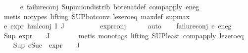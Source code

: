 \begin{isabellebody}
\ \ \ \ \isamarkupfalse%
\ e{}{\isacharunderscore}{\kern0pt}{}\ failure{\isacharunderscore}{\kern0pt}conj\ Sup{\isacharunderscore}{\kern0pt}union{\isacharunderscore}{\kern0pt}distrib\ bot{\isacharunderscore}{\kern0pt}enat{\isacharunderscore}{\kern0pt}def\ comp{\isacharunderscore}{\kern0pt}apply\ e{}{\isacharunderscore}{\kern0pt}neg\isanewline
\ \ \ \ \isamarkupfalse%
\ {\isacharparenleft}{\kern0pt}metis\ {\isacharparenleft}{\kern0pt}no{\isacharunderscore}{\kern0pt}types{\isacharcomma}{\kern0pt}\ lifting{\isacharparenright}{\kern0pt}\ SUP{\isacharunderscore}{\kern0pt}bot{\isacharunderscore}{\kern0pt}conv{\isacharparenleft}{\kern0pt}{}{\isacharparenright}{\kern0pt}\ le{\isacharunderscore}{\kern0pt}zero{\isacharunderscore}{\kern0pt}eq\ max{\isacharunderscore}{\kern0pt}def\ sup{\isacharunderscore}{\kern0pt}max{\isacharparenright}{\kern0pt}\ \isanewline
\ \ \isamarkupfalse%
\ e{}{\isacharcolon}{\kern0pt}\ {\isachardoublequoteopen}expr{\isacharunderscore}{\kern0pt}{}\ {\isacharparenleft}{\kern0pt}hml{\isacharunderscore}{\kern0pt}conj\ I\ J\ {\isasymPhi}{\isacharparenright}{\kern0pt}\ {\isasymle}\ {}{\isachardoublequoteclose}\ \isanewline
\ \ \ \ \isamarkupfalse%
\ expr{\isacharunderscore}{\kern0pt}{}{\isacharunderscore}{\kern0pt}conj\isanewline
\ \ \ \ \isamarkupfalse%
\ auto\isanewline
\ \ \isamarkupfalse%
\ failure{\isacharunderscore}{\kern0pt}conj\ e{}{\isacharunderscore}{\kern0pt}{}\ e{}{\isacharunderscore}{\kern0pt}neg\ \isamarkupfalse%
\ {\isachardoublequoteopen}Sup\ {\isacharparenleft}{\kern0pt}{\isacharparenleft}{\kern0pt}expr{\isacharunderscore}{\kern0pt}{}\ {\isasymcirc}\ {\isasymPhi}{\isacharparenright}{\kern0pt}\ {\isacharbackquote}{\kern0pt}\ J{\isacharparenright}{\kern0pt}\ {\isasymle}\ {}{\isachardoublequoteclose}\isanewline
\ \ \ \ \isamarkupfalse%
\ {\isacharparenleft}{\kern0pt}metis\ {\isacharparenleft}{\kern0pt}mono{\isacharunderscore}{\kern0pt}tags{\isacharcomma}{\kern0pt}\ lifting{\isacharparenright}{\kern0pt}\ SUP{\isacharunderscore}{\kern0pt}least\ comp{\isacharunderscore}{\kern0pt}apply\ le{\isacharunderscore}{\kern0pt}zero{\isacharunderscore}{\kern0pt}eq{\isacharparenright}{\kern0pt}\isanewline
\ \ \isamarkupfalse%
\ {\isachardoublequoteopen}Sup\ {\isacharparenleft}{\kern0pt}{\isacharparenleft}{\kern0pt}eSuc\ {\isasymcirc}\ expr{\isacharunderscore}{\kern0pt}{}\ {\isasymcirc}\ {\isasymPhi}{\isacharparenright}{\kern0pt}\ {\isacharbackquote}{\kern0pt}\ J{\isacharparenright}{\kern0pt}\ {\isasymle}\ {}{\isachardoublequoteclose}\isanewline

\end{isabellebody}
